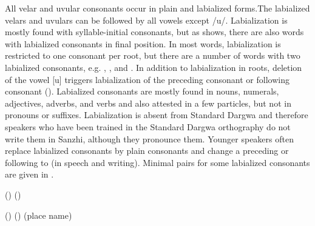 All velar and uvular consonants occur in plain and labialized forms.The labialized velars and uvulars can be followed by all vowels except /u/. Labialization is mostly found with syllable-initial consonants, but as  shows, there are also words with labialized consonants in final position. In most words, labialization is restricted to one consonant per root, but there are a number of words with two labialized consonants, e.g.  ,  , and  . In addition to labialization in roots, deletion of the vowel [u] triggers labialization of the preceding consonant or following consonant (). Labialized consonants are mostly found in nouns, numerals, adjectives, adverbs, and verbs and also attested in a few particles, but not in pronouns or suffixes. Labialization is absent from Standard Dargwa and therefore speakers who have been trained in the Standard Dargwa orthography do not write them in Sanzhi, although they pronounce them. Younger speakers often replace labialized consonants by plain consonants and change a preceding or following  to  (in speech and writing). Minimal pairs for some labialized consonants are given in .
%
\begin{exe}
	\ex	\label{ex:labialization phon@A}
	\begin{xlist}
		\TabPositions{11em}
		\ex	{} () 	\tab {} () \label{ex:delqij phon}
		
		\ex	{} () 	\tab {} () 	\label{ex:bixwij phon}
		\ex	{}  (place name)	\tab {}  \label{ex:akri phon}
		\ex	{} 	\tab {} 	\label{ex:ikwij phon}
	\end{xlist}
\end{exe}

